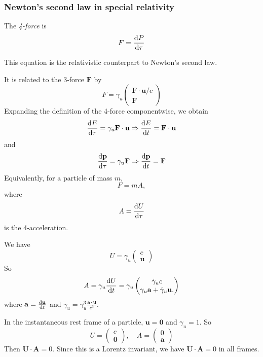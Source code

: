 \documentclass[a4paper]{article}
\begin{document}
\subsubsection*{Newton's second law in special relativity}
\begin{defi}[4-force]
  The \emph{4-force} is
  \[
    F = \frac{\mathrm{d} P}{\mathrm{d} \tau}
  \]
\end{defi}
This equation is the relativistic counterpart to Newton's second law.

It is related to the 3-force $\mathbf{F}$ by
\[
  F = \gamma_u
  \begin{pmatrix}
    \mathbf{F}\cdot \mathbf{u}/c\\
    \mathbf{F}
  \end{pmatrix}
\]
Expanding the definition of the 4-force componentwise, we obtain
\[
  \frac{\mathrm{d} E}{\mathrm{d} \tau} = \gamma_u \mathbf{F}\cdot \mathbf{u} \Rightarrow  \frac{\mathrm{d} E}{\mathrm{d} t} = \mathbf{F}\cdot \mathbf{u}
\]
and
\[
  \frac{\mathrm{d} \mathbf{p}}{\mathrm{d} \tau} = \gamma_u \mathbf{F} \Rightarrow  \frac{\mathrm{d} \mathbf{p}}{\mathrm{d} t} = \mathbf{F}
\]
Equivalently, for a particle of mass $m$,
\[
  F =mA,
\]
where
\[
  A = \frac{\mathrm{d} U}{\mathrm{d} \tau}
\]
is the 4-acceleration.

We have
\[
  U = \gamma_u
  \begin{pmatrix}
    c\\
    \mathbf{u}
  \end{pmatrix}
\]
So
\[
  A = \gamma_u \frac{\mathrm{d} U}{\mathrm{d} t} = \gamma_u
  \begin{pmatrix}
    \dot{\gamma}_u c\\
    \gamma_u \mathbf{a} + \dot{\gamma}_u \mathbf{u}.
  \end{pmatrix}
\]
where $\mathbf{\mathbf{a}} = \frac{\mathrm{d} \mathbf{u}}{\mathrm{d} t}$ and $\dot{\gamma}_u = \gamma_u^3 \frac{\mathbf{a}\cdot \mathbf{u}}{c^3}$.

In the instantaneous rest frame of a particle, $\mathbf{u} = \mathbf{0}$ and $\gamma_u = 1$. So
\[
  U =
  \begin{pmatrix}
    c\\
    \mathbf{0}
  \end{pmatrix}, \quad
  A = 
  \begin{pmatrix}
    0\\
    \mathbf{a}
  \end{pmatrix}
\]
Then $\mathbf{U}\cdot \mathbf{A} = 0$. Since this is a Lorentz invariant, we have $\mathbf{U} \cdot \mathbf{A} = 0$ in all frames.
\end{document}
